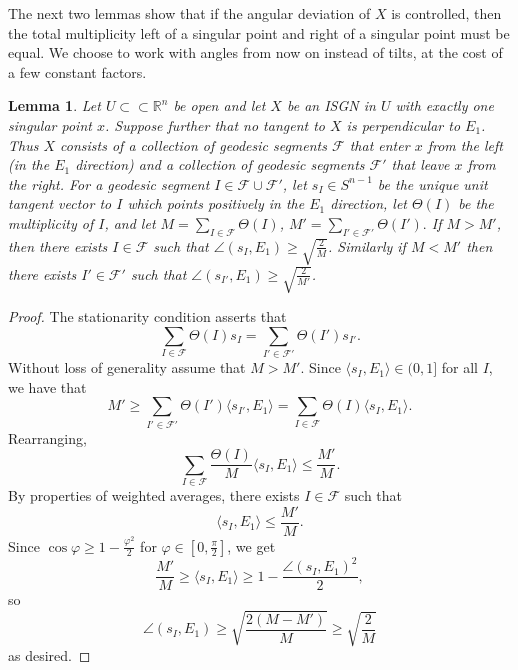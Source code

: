 \documentclass[11pt,reqno,twoside]{amsart}
\newtheorem{lemma}{Lemma}
\theoremstyle{definition}
\begin{document}
The next two lemmas show that if the angular deviation of $X$ is controlled, then the total multiplicity left of a singular point and right of a singular point must be equal. We choose to work with angles from now on instead of tilts, at the cost of a few constant factors.

\begin{lemma} \label{two-sides}
Let $U \subset\subset \mathbb{R}^n$ be open and let $X$ be an ISGN in $U$ with exactly one singular point $x$. Suppose further that no tangent to $X$ is perpendicular to $E_1$. Thus $X$ consists of a collection of geodesic segments $\mathcal{F}$ that enter $x$ from the left (in the $E_1$ direction) and a collection of geodesic segments $\mathcal{F}'$ that leave $x$ from the right. For a geodesic segment $I \in \mathcal{F} \cup \mathcal{F}'$, let $s_I \in S^{n-1}$ be the unique unit tangent vector to $I$ which points positively in the $E_1$ direction, let $\Theta(I)$ be the multiplicity of $I$, and let $M = \sum_{I \in \mathcal{F}} \Theta(I)$, $M' = \sum_{I' \in \mathcal{F}'} \Theta(I').$ If $M > M'$, then there exists $I \in \mathcal{F}$ such that $\angle(s_I,E_1) \geq \sqrt{\frac{2}{M}}$. Similarly if $M < M'$ then there exists $I' \in \mathcal{F}'$ such that $\angle(s_{I'},E_1) \geq \sqrt{\frac{2}{M'}}$.
    
\end{lemma}

\begin{proof}
   The stationarity condition asserts that
\[\sum_{I \in \mathcal{F}} \Theta(I) s_I = \sum_{I' \in \mathcal{F}'} \Theta(I') s_{I'}.\]
Without loss of generality assume that $M > M'$. Since $\langle s_{I},E_1\rangle \in (0,1]$ for all $I$, we have that
\[M' \geq \sum_{I' \in \mathcal{F}'} \Theta (I') \langle s_{I'} ,E_1\rangle = \sum_{I \in \mathcal{F}} \Theta(I)\langle s_{I},E_1\rangle.\]
Rearranging,
\[\sum_{I \in \mathcal{F}} \frac{\Theta(I)}{M}\langle s_{I},E_1\rangle \leq \frac{M'}{M}.\]
By properties of weighted averages, there exists $I \in \mathcal{F}$ such that
\[\langle s_I,E_1\rangle \leq \frac{M'}{M}.\]
Since $\cos \varphi \geq 1-\frac{\varphi^2}{2}$ for $\varphi \in [0,\frac{\pi}{2}]$, we get 
\[\frac{M'}{M} \geq \langle s_I,E_1\rangle \geq 1 - \frac{\angle(s_I,E_1)^2}{2},\]
so
\[\angle(s_I,E_1) \geq \sqrt{\frac{2(M-M')}{M}} \geq \sqrt{\frac{2}{M}}\]
as desired.
\end{proof}
\end{document}
